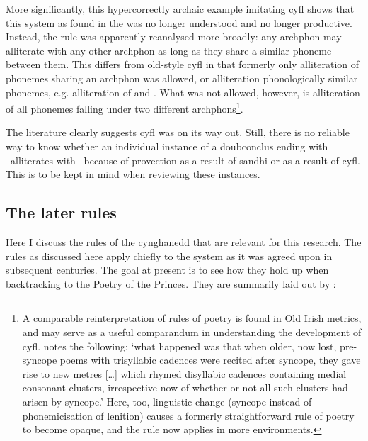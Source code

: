 More significantly, this hypercorrectly archaic example imitating \gls{cyfl} shows that this system as found in the  was no longer understood and no longer productive. Instead, the rule was apparently reanalysed more broadly: any \gls{archphon} may alliterate with any other \gls{archphon} as long as they share a similar phoneme between them. This differs from old-style \gls{cyfl} in that formerly only alliteration of phonemes sharing an \gls{archphon} was allowed, or alliteration phonologically similar phonemes, e.g. alliteration of  and . What was not allowed, however, is alliteration of all phonemes falling under two different \gls{archphon}s\footnote{A comparable reinterpretation of rules of poetry is found in Old Irish metrics, and may serve as a useful comparandum in understanding the development of \gls{cyfl}. \textcite[173]{sims-williams_dating_2016} notes the following: `what happened was that when older, now lost, pre-syncope poems with trisyllabic cadences were recited after syncope, they gave rise to new metres […] which rhymed disyllabic cadences containing medial consonant clusters, irrespective now of whether or not all such clusters had arisen by syncope.' Here, too, linguistic change (syncope instead of phonemicisation of lenition) causes a formerly straightforward rule of poetry to become opaque, and the rule now applies in more environments.
}.

The literature clearly suggests \gls{cyfl} was on its way out. Still, there is no reliable way to know whether an individual instance of a \gls{doubconclus} ending with \lT\ alliterates with \xT\ because of provection as a result of sandhi or as a result of \gls{cyfl}. This is to be kept in mind when reviewing these instances.

\subsection{The later rules}
\label{sec:later-rules}
Here I discuss the rules of the cynghanedd that are relevant for this research. The rules as discussed here apply chiefly to the system as it was agreed upon in subsequent centuries. The goal at present is to see how they hold up when backtracking to the Poetry of the Princes.
They are summarily laid out by \textcite{roberts_anghenion_1973}:


